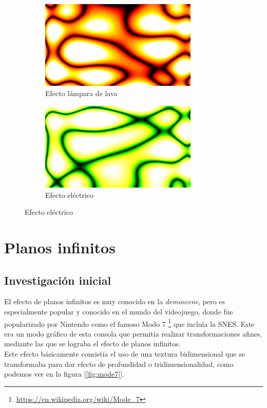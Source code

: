 \begin{figure}[h]
	\centering
	\begin{subfigure}[b]{0.48\textwidth}
		\centering
		\includegraphics[width=7.5cm]{archivos/redplasma}
		\caption{Efecto lámpara de lava}
	\end{subfigure}
	\begin{subfigure}[b]{0.48\textwidth}
		\centering
		\includegraphics[width=7.5cm]{archivos/greenplasma}
		\caption{Efecto eléctrico}
	\end{subfigure}
\end{figure}

\section{Planos infinitos} \label{sec:planes}

\subsection{Investigación inicial}

El efecto de planos infinitos es muy conocido en la \emph{demoscene}, pero es especialmente popular y conocido en el mundo del videojuego, donde fue popularizado por Nintendo como el famoso Modo 7 \footnote{\url{https://en.wikipedia.org/wiki/Mode_7}} que incluía la SNES. Este era un modo gráfico de esta consola que permitía realizar transformaciones afines, mediante las que se lograba el efecto de planos infinitos.\\

Este efecto básicamente consistía el uso de una textura bidimensional que se transformaba para dar efecto de profundidad o tridimensionalidad, como podemos ver en la figura [\ref{fig:mode7}].\\

